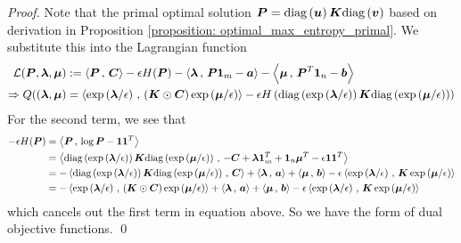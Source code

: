 \documentclass[11pt]{article}
\begin{document}
\begin{proof}
Note that the primal optimal solution $\mb{P} = \diag{\mb{u}}\mb{K}\diag{\mb{v}}$ based on derivation in Proposition \ref{proposition: optimal_max_entropy_primal}. We substitute this into the Lagrangian function
\begin{align*}
\cL(\mb{P}, \mb{\lambda}, \mb{\mu}) &:= \inn{\mb{P}}{\mb{C}} - \epsilon H(\mb{P}) - \inn{\mb{\lambda}}{\mb{P}\mb{1}_{m} - \mb{a}} - \inn{\mb{\mu}}{\mb{P}^{T}\mb{1}_{n} - \mb{b}} \\
\Rightarrow  Q((\mb{\lambda} , \mb{\mu})& = \inn{\exp\paren{\mb{\lambda}/\epsilon}}{\paren{\mb{K}\odot \mb{C}}\exp\paren{\mb{\mu}/\epsilon}} -  \epsilon H\paren{ \diag{\exp\paren{\mb{\lambda}/\epsilon}}\mb{K}\diag{\exp\paren{\mb{\mu}/\epsilon}}}
\end{align*} For the second term, we see that 
\begin{align*}
-\epsilon H(\mb{P}) &= \inn{\mb{P}}{\log \mb{P} - \mb{1}\mb{1}^{T}}\\
&= \inn{\diag{\exp\paren{\mb{\lambda}/\epsilon}}\mb{K}\diag{\exp\paren{\mb{\mu}/\epsilon}}}{- \mb{C} +  \mb{\lambda}\mb{1}_{m}^{T} + \mb{1}_{n}\mb{\mu}^{T} - \epsilon\mb{1}\mb{1}^{T}} \\
&=- \inn{\diag{\exp\paren{\mb{\lambda}/\epsilon}}\mb{K}\diag{\exp\paren{\mb{\mu}/\epsilon}}}{\mb{C}} + \inn{\mb{\lambda}}{\mb{a}} + \inn{\mb{\mu}}{\mb{b}} - \epsilon \inn{\exp\paren{\mb{\lambda}/\epsilon}}{\mb{K}\exp\paren{\mb{\mu}/\epsilon}} \\
&= - \inn{\exp\paren{\mb{\lambda}/\epsilon}}{\paren{\mb{K}\odot\mb{C}}\exp\paren{\mb{\mu}/\epsilon}} + \inn{\mb{\lambda}}{\mb{a}} + \inn{\mb{\mu}}{\mb{b}} - \epsilon \inn{\exp\paren{\mb{\lambda}/\epsilon}}{\mb{K}\exp\paren{\mb{\mu}/\epsilon}}
\end{align*} which cancels out the first term in equation above. So we have the form of dual objective functions. \qed
\end{proof}
\end{document}
